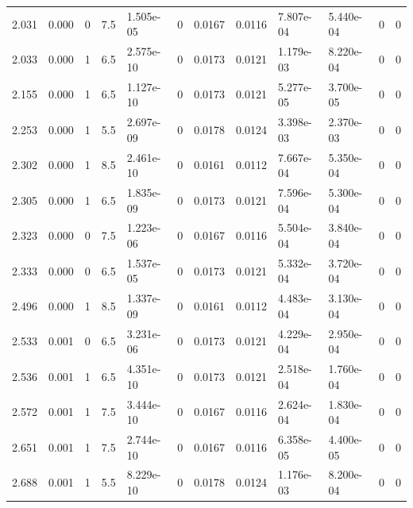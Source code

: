 \documentclass[preview]{standalone}
\begin{document}
{{\begin{tabular}{L{1.2cm}C{1.2cm} C{0.3cm}C{0.5cm} C{1.4cm}C{1.4cm} C{1.4cm}C{1.4cm} C{1.6cm}C{1.6cm} C{1.6cm}C{1.6cm}}
  2.031  &  0.000  & 0     & 7.5 &  1.505e-05  & 0  &  0.0167&   0.0116& 7.807e-04 & 5.440e-04   &  0 & 0  \\ 
  2.033  &  0.000  & 1     & 6.5 &  2.575e-10  & 0  &  0.0173&   0.0121& 1.179e-03 & 8.220e-04   &  0 & 0  \\ 
  2.155  &  0.000  & 1     & 6.5 &  1.127e-10  & 0  &  0.0173&   0.0121& 5.277e-05 & 3.700e-05   &  0 & 0  \\ 
  2.253  &  0.000  & 1     & 5.5 &  2.697e-09  & 0  &  0.0178&   0.0124& 3.398e-03 & 2.370e-03   &  0 & 0  \\ 
  2.302  &  0.000  & 1     & 8.5 &  2.461e-10  & 0  &  0.0161&   0.0112& 7.667e-04 & 5.350e-04   &  0 & 0  \\ 
  2.305  &  0.000  & 1     & 6.5 &  1.835e-09  & 0  &  0.0173&   0.0121& 7.596e-04 & 5.300e-04   &  0 & 0  \\ 
  2.323  &  0.000  & 0     & 7.5 &  1.223e-06  & 0  &  0.0167&   0.0116& 5.504e-04 & 3.840e-04   &  0 & 0  \\ 
  2.333  &  0.000  & 0     & 6.5 &  1.537e-05  & 0  &  0.0173&   0.0121& 5.332e-04 & 3.720e-04   &  0 & 0  \\ 
  2.496  &  0.000  & 1     & 8.5 &  1.337e-09  & 0  &  0.0161&   0.0112& 4.483e-04 & 3.130e-04   &  0 & 0  \\ 
  2.533  &  0.001  & 0     & 6.5 &  3.231e-06  & 0  &  0.0173&   0.0121& 4.229e-04 & 2.950e-04   &  0 & 0  \\ 
  2.536  &  0.001  & 1     & 6.5 &  4.351e-10  & 0  &  0.0173&   0.0121& 2.518e-04 & 1.760e-04   &  0 & 0  \\ 
  2.572  &  0.001  & 1     & 7.5 &  3.444e-10  & 0  &  0.0167&   0.0116& 2.624e-04 & 1.830e-04   &  0 & 0  \\ 
  2.651  &  0.001  & 1     & 7.5 &  2.744e-10  & 0  &  0.0167&   0.0116& 6.358e-05 & 4.400e-05   &  0 & 0  \\ 
  2.688  &  0.001  & 1     & 5.5 &  8.229e-10  & 0  &  0.0178&   0.0124& 1.176e-03 & 8.200e-04   &  0 & 0  \\ 
\hline 
\end{tabular} 

}}
\end{document}
